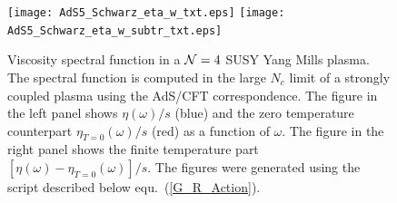 \begin{figure}[t!]
\begin{center}
\texttt{[image: AdS5\_Schwarz\_eta\_w\_txt.eps]}
\texttt{[image: AdS5\_Schwarz\_eta\_w\_subtr\_txt.eps]}
\end{center}
\caption{\label{fig_ads_spec_fct}
Viscosity spectral function in a ${\cal N}=4$ SUSY Yang Mills plasma. 
The spectral function is computed in the large $N_c$ limit of a strongly 
coupled plasma using the AdS/CFT correspondence. The figure in the left 
panel shows $\eta(\omega)/s$ (blue) and the zero temperature counterpart 
$\eta_{T=0}(\omega)/s$ (red) as a function of $\omega$. The figure in the 
right panel shows the finite temperature part $[\eta(\omega)-\eta_{T=0}
(\omega)]/s$. The figures were generated using the script described 
below equ.~(\ref{G_R_Action}).}
\end{figure}

